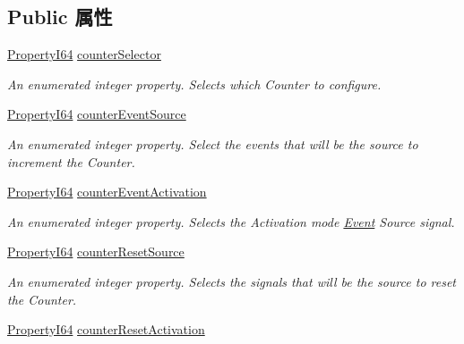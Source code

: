\subsection*{Public 属性}
\begin{DoxyCompactItemize}
\item 
\hyperlink{group___common_interface_ga81749b2696755513663492664a18a893}{Property\+I64} \hyperlink{classmv_i_m_p_a_c_t_1_1acquire_1_1_gen_i_cam_1_1_counter_and_timer_control_a2a8a3d52a70268d61a7f33ccedaa6c9c}{counter\+Selector}
\begin{DoxyCompactList}\small\item\em An enumerated integer property. Selects which Counter to configure. \end{DoxyCompactList}\item 
\hyperlink{group___common_interface_ga81749b2696755513663492664a18a893}{Property\+I64} \hyperlink{classmv_i_m_p_a_c_t_1_1acquire_1_1_gen_i_cam_1_1_counter_and_timer_control_a449221a170934fd17e3c3253f935074a}{counter\+Event\+Source}
\begin{DoxyCompactList}\small\item\em An enumerated integer property. Select the events that will be the source to increment the Counter. \end{DoxyCompactList}\item 
\hyperlink{group___common_interface_ga81749b2696755513663492664a18a893}{Property\+I64} \hyperlink{classmv_i_m_p_a_c_t_1_1acquire_1_1_gen_i_cam_1_1_counter_and_timer_control_ab70baba2a6ef16bf43522414274b3740}{counter\+Event\+Activation}
\begin{DoxyCompactList}\small\item\em An enumerated integer property. Selects the Activation mode \hyperlink{classmv_i_m_p_a_c_t_1_1acquire_1_1_event}{Event} Source signal. \end{DoxyCompactList}\item 
\hyperlink{group___common_interface_ga81749b2696755513663492664a18a893}{Property\+I64} \hyperlink{classmv_i_m_p_a_c_t_1_1acquire_1_1_gen_i_cam_1_1_counter_and_timer_control_aec76b87580e5aef5ef034d11b44f1428}{counter\+Reset\+Source}
\begin{DoxyCompactList}\small\item\em An enumerated integer property. Selects the signals that will be the source to reset the Counter. \end{DoxyCompactList}\item 
\hyperlink{group___common_interface_ga81749b2696755513663492664a18a893}{Property\+I64} \hyperlink{classmv_i_m_p_a_c_t_1_1acquire_1_1_gen_i_cam_1_1_counter_and_timer_control_a94c6a18dd21c201e57240f0d7427958f}{counter\+Reset\+Activation}

\end{DoxyCompactItemize}

